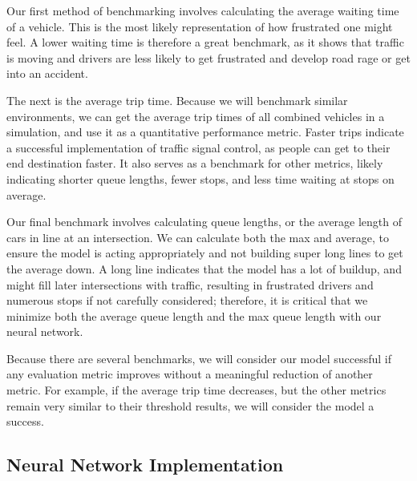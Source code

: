 \documentclass[conference]{IEEEtran}
\begin{document}
Our first method of benchmarking involves calculating the average waiting time of a vehicle. This is the most likely representation of how frustrated one might feel. A lower waiting time is therefore a great benchmark, as it shows that traffic is moving and drivers are less likely to get frustrated and develop road rage or get into an accident. 

The next is the average trip time. Because we will benchmark similar environments, we can get the average trip times of all combined vehicles in a simulation, and use it as a quantitative performance metric. Faster trips indicate a successful implementation of traffic signal control, as people can get to their end destination faster. It also serves as a benchmark for other metrics, likely indicating shorter queue lengths, fewer stops, and less time waiting at stops on average. 

Our final benchmark involves calculating queue lengths, or the average length of cars in line at an intersection. We can calculate both the max and average, to ensure the model is acting appropriately and not building super long lines to get the average down. A long line indicates that the model has a lot of buildup, and might fill later intersections with traffic, resulting in frustrated drivers and numerous stops if not carefully considered; therefore, it is critical that we minimize both the average queue length and the max queue length with our neural network. 

Because there are several benchmarks, we will consider our model successful if any evaluation metric improves without a meaningful reduction of another metric. For example, if the average trip time decreases, but the other metrics remain very similar to their threshold results, we will consider the model a success.

\subsection{Neural Network Implementation}
\end{document}
